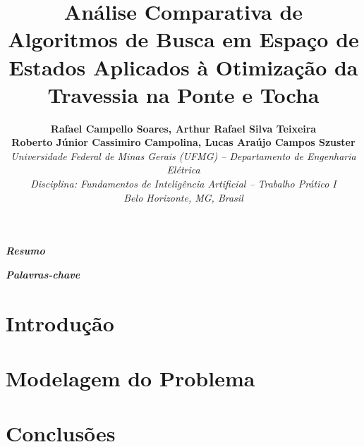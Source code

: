 \documentclass[10pt,twocolumn,a4paper]{article}
\title{\vspace{-1.5cm}\textbf{Análise Comparativa de Algoritmos de Busca em Espaço de Estados Aplicados à Otimização da Travessia na Ponte e Tocha}}
\author{
    \textbf{Rafael Campello Soares, Arthur Rafael Silva Teixeira}\\
    \textbf{Roberto Júnior Cassimiro Campolina, Lucas Araújo Campos Szuster}\\
    \textit{Universidade Federal de Minas Gerais (UFMG) -- Departamento de Engenharia Elétrica}\\
    \textit{Disciplina: Fundamentos de Inteligência Artificial -- Trabalho Prático I}\\
    \textit{Belo Horizonte, MG, Brasil}
}
\date{}
\begin{document}
\maketitle

\noindent\textbf{\textit{Resumo}} 

\vspace{0.3cm}
\noindent\textbf{\textit{Palavras-chave}} 

\vspace{0.5cm}

\section{Introdução}

\section{Modelagem do Problema}

\section{Conclusões}
\end{document}
